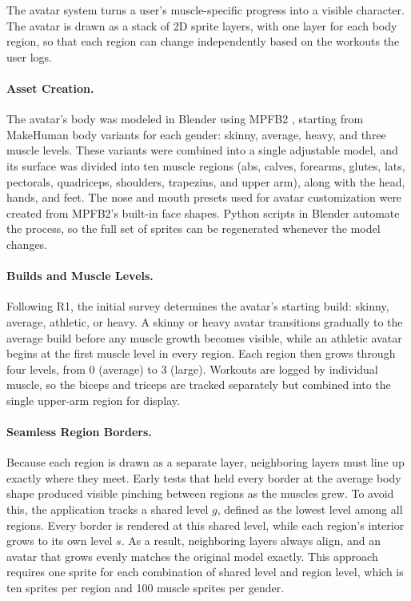 \documentclass[11pt]{article}
\begin{document}
The avatar system turns a user's muscle-specific progress into a visible character. The avatar is drawn as a stack of 2D sprite layers, with one layer for each body region, so that each region can change independently based on the workouts the user logs.

\paragraph{Asset Creation.}
The avatar's body was modeled in Blender using MPFB2 \cite{blender, mpfb2}, starting from MakeHuman body variants for each gender: skinny, average, heavy, and three muscle levels. These variants were combined into a single adjustable model, and its surface was divided into ten muscle regions (abs, calves, forearms, glutes, lats, pectorals, quadriceps, shoulders, trapezius, and upper arm), along with the head, hands, and feet. The nose and mouth presets used for avatar customization were created from MPFB2's built-in face shapes. Python scripts in Blender automate the process, so the full set of sprites can be regenerated whenever the model changes.

\paragraph{Builds and Muscle Levels.}
Following R1, the initial survey determines the avatar's starting build: skinny, average, athletic, or heavy. A skinny or heavy avatar transitions gradually to the average build before any muscle growth becomes visible, while an athletic avatar begins at the first muscle level in every region. Each region then grows through four levels, from 0 (average) to 3 (large). Workouts are logged by individual muscle, so the biceps and triceps are tracked separately but combined into the single upper-arm region for display.

\paragraph{Seamless Region Borders.}
Because each region is drawn as a separate layer, neighboring layers must line up exactly where they meet. Early tests that held every border at the average body shape produced visible pinching between regions as the muscles grew. To avoid this, the application tracks a shared level $g$, defined as the lowest level among all regions. Every border is rendered at this shared level, while each region's interior grows to its own level $s$. As a result, neighboring layers always align, and an avatar that grows evenly matches the original model exactly. This approach requires one sprite for each combination of shared level and region level, which is ten sprites per region and 100 muscle sprites per gender.
\end{document}
